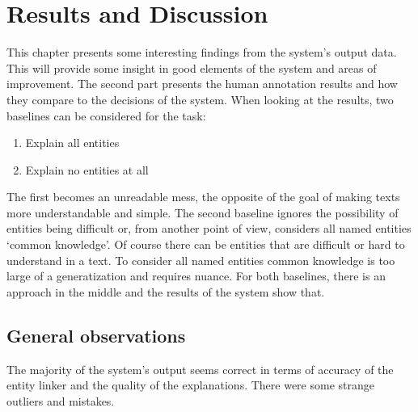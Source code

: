 \documentclass[
10pt, %
a4paper, %
oneside, %
headinclude,footinclude, %
] {book}%
\begin{document}
\chapter{Results and Discussion}

This chapter presents some interesting findings from the system's output data.
This will provide some insight in good elements of the system and areas of improvement.
The second part presents the human annotation results and how they compare to the decisions of the system.
When looking at the results, two baselines can be considered for the task:
\begin{multicols}{2}
  \begin{enumerate}
    \item Explain all entities
    \item Explain no entities at all
  \end{enumerate}
\end{multicols}

The first becomes an unreadable mess, the opposite of the goal of making texts more understandable and simple.
The second baseline ignores the possibility of entities being difficult or, from another point of view, considers all named entities `common knowledge'.
Of course there can be entities that are difficult or hard to understand in a text.
To consider all named entities common knowledge is too large of a generatization and requires nuance.
For both baselines, there is an approach in the middle and the results of the system show that.

\section{General observations}
The majority of the system's output seems correct in terms of accuracy of the entity linker and the quality of the explanations.
There were some strange outliers and mistakes.
\end{document}
